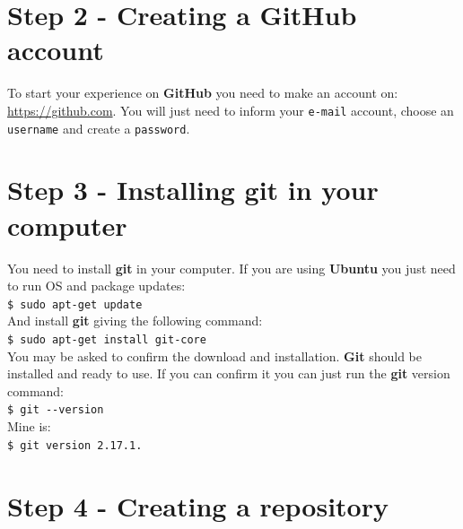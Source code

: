 \documentclass[12pt,a4paper,titlepage,brazil]{article}
\begin{document}

\section{Step 2 - Creating a GitHub account}

To start your experience on {\bf GitHub} you need to make an account on:
\url{https://github.com}. You will just need to inform your \texttt{e-mail} account, choose an \texttt{username} and create a \texttt{password}.


\section{Step 3 - Installing git in your computer}

You need to install {\bf git} in your computer. If you are using {\bf Ubuntu} you just need to run OS and package updates:\\

\texttt{\$ sudo apt-get update}\\

And install {\bf git} giving the following command:\\

\texttt{\$ sudo apt-get install git-core}\\

You may be asked to confirm the download and installation. {\bf Git} should be installed and ready to use. If you can confirm it you can just run the {\bf git} version command:\\

\texttt{\$ git -\hspace{0.01cm}-version}\\

Mine is:\\

\texttt{\$ git version 2.17.1.}\\



\section{Step 4 - Creating a repository}
\end{document}
